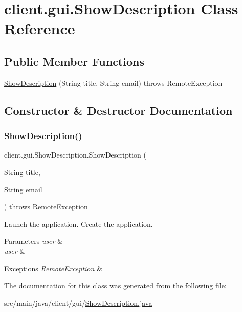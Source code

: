 \hypertarget{classclient_1_1gui_1_1_show_description}{}\section{client.\+gui.\+Show\+Description Class Reference}
\label{classclient_1_1gui_1_1_show_description}
\subsection*{Public Member Functions}
\begin{DoxyCompactItemize}
\item 
\hyperlink{classclient_1_1gui_1_1_show_description_a6cf3928ce8f8169f5f3dc25956c8836c}{Show\+Description} (String title, String email)  throws Remote\+Exception 
\end{DoxyCompactItemize}


\subsection{Constructor \& Destructor Documentation}
\mbox{\label{classclient_1_1gui_1_1_show_description_a6cf3928ce8f8169f5f3dc25956c8836c}} 
\subsubsection{\texorpdfstring{Show\+Description()}{ShowDescription()}}
{\footnotesize\ttfamily client.\+gui.\+Show\+Description.\+Show\+Description (\begin{DoxyParamCaption}\item[{String}]{title,  }\item[{String}]{email }\end{DoxyParamCaption}) throws Remote\+Exception}

Launch the application. Create the application. 
\begin{DoxyParams}{Parameters}
{\em user} & \\
\hline
{\em user} & \\
\hline
\end{DoxyParams}

\begin{DoxyExceptions}{Exceptions}
{\em Remote\+Exception} & \\
\hline
\end{DoxyExceptions}


The documentation for this class was generated from the following file\+:\begin{DoxyCompactItemize}
\item 
src/main/java/client/gui/\hyperlink{_show_description_8java}{Show\+Description.\+java}\end{DoxyCompactItemize}
